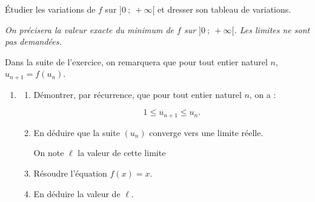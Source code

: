 \begin{enumerate}
Étudier les variations de $f$ sur $]0~;~+\infty[$ et dresser son tableau de variations.
	
\emph{On précisera la valeur exacte du minimum de $f$ sur $]0~;~+\infty[$. Les limites ne sont pas demandées.}
\end{enumerate}

Dans la suite de l'exercice, on remarquera que pour tout entier naturel $n$,\: $u_{n+1} = f\left(u_n\right)$.

\begin{enumerate}[resume]
\item 
	\begin{enumerate}
		\item Démontrer, par récurrence, que pour tout entier naturel $n$, on a : 

		\[ 1 \leqslant u_{n+1} \leqslant u_n. \]
		\item En déduire que la suite $\left(u_n\right)$ converge vers une limite réelle.

On note $\ell$ la valeur de cette limite 
		\item Résoudre l'équation $f(x) = x$.
		\item En déduire la valeur de $\ell$.
	\end{enumerate}
\end{enumerate}

\bigskip
